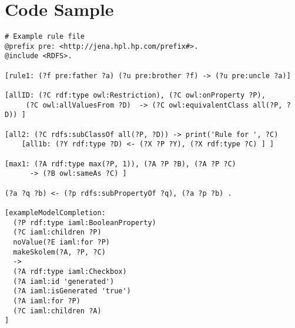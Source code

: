 \chapter{Code Sample}

\begin{verbatim}
# Example rule file
@prefix pre: <http://jena.hpl.hp.com/prefix#>.
@include <RDFS>.

[rule1: (?f pre:father ?a) (?u pre:brother ?f) -> (?u pre:uncle ?a)]

[allID: (?C rdf:type owl:Restriction), (?C owl:onProperty ?P), 
     (?C owl:allValuesFrom ?D)  -> (?C owl:equivalentClass all(?P, ?D)) ]

[all2: (?C rdfs:subClassOf all(?P, ?D)) -> print('Rule for ', ?C)
    [all1b: (?Y rdf:type ?D) <- (?X ?P ?Y), (?X rdf:type ?C) ] ]

[max1: (?A rdf:type max(?P, 1)), (?A ?P ?B), (?A ?P ?C) 
      -> (?B owl:sameAs ?C) ]

(?a ?q ?b) <- (?p rdfs:subPropertyOf ?q), (?a ?p ?b) .

[exampleModelCompletion:
  (?P rdf:type iaml:BooleanProperty)
  (?C iaml:children ?P)
  noValue(?E iaml:for ?P)
  makeSkolem(?A, ?P, ?C)
  ->
  (?A rdf:type iaml:Checkbox)
  (?A iaml:id 'generated')
  (?A iaml:isGenerated 'true')
  (?A iaml:for ?P)
  (?C iaml:children ?A)
]
\end{verbatim}
